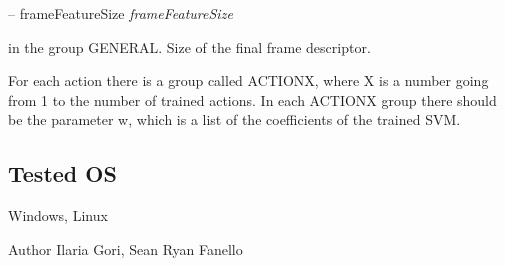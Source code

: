 -- frame\+Feature\+Size {\itshape frame\+Feature\+Size} 
\begin{DoxyItemize}
\item in the group G\+E\+N\+E\+R\+AL. Size of the final frame descriptor.
\end{DoxyItemize}

For each action there is a group called A\+C\+T\+I\+O\+NX, where X is a number going from 1 to the number of trained actions. In each A\+C\+T\+I\+O\+NX group there should be the parameter w, which is a list of the coefficients of the trained S\+VM.\hypertarget{group__gestureRecognitionStereo_tested_os_sec}{}\subsection{Tested OS}\label{group__gestureRecognitionStereo_tested_os_sec}
Windows, Linux

\begin{DoxyAuthor}{Author}
Ilaria Gori, Sean Ryan Fanello 
\end{DoxyAuthor}
